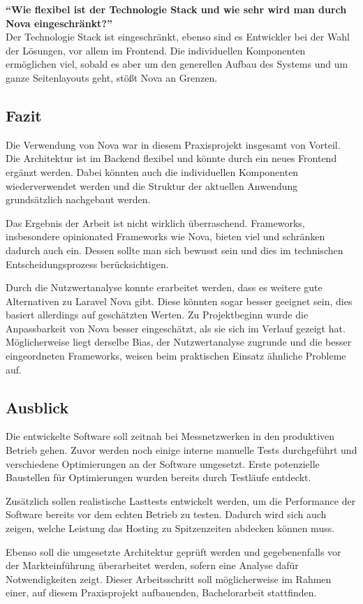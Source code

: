 \textbf{\enquote{Wie flexibel ist der Technologie Stack und wie sehr wird man durch Nova eingeschränkt?}}\\
Der Technologie Stack ist eingeschränkt, ebenso sind es Entwickler bei der Wahl der Lösungen, vor allem im Frontend.
Die individuellen Komponenten ermöglichen viel, sobald es aber um den generellen Aufbau des Systems und um ganze Seitenlayouts geht, stößt Nova an Grenzen.

\subsection{Fazit}
Die Verwendung von Nova war in diesem Praxisprojekt insgesamt von Vorteil.
Die Architektur ist im Backend flexibel und könnte durch ein neues Frontend ergänzt werden.
Dabei könnten auch die individuellen Komponenten wiederverwendet werden und die Struktur der aktuellen Anwendung grundsätzlich nachgebaut werden.

Das Ergebnis der Arbeit ist nicht wirklich überraschend.
Frameworks, insbesondere opinionated Frameworks wie Nova, bieten viel und schränken dadurch auch ein.
Dessen sollte man sich bewusst sein und dies im technischen Entscheidungsprozess berücksichtigen.

Durch die Nutzwertanalyse konnte erarbeitet werden, dass es weitere gute Alternativen zu Laravel Nova gibt.
Diese könnten sogar besser geeignet sein, dies basiert allerdings auf geschätzten Werten.
Zu Projektbeginn wurde die Anpassbarkeit von Nova besser eingeschätzt, als sie sich im Verlauf gezeigt hat.
Möglicherweise liegt derselbe Bias, der Nutzwertanalyse zugrunde und die besser eingeordneten Frameworks, weisen beim praktischen Einsatz ähnliche Probleme auf.

\subsection{Ausblick}
Die entwickelte Software soll zeitnah bei Messnetzwerken in den produktiven Betrieb gehen.
Zuvor werden noch einige interne manuelle Tests durchgeführt und verschiedene Optimierungen an der Software umgesetzt.
Erste potenzielle Baustellen für Optimierungen wurden bereits durch Testläufe entdeckt.

Zusätzlich sollen realistische Lasttests entwickelt werden, um die Performance der Software bereits vor dem echten Betrieb zu testen.
Dadurch wird sich auch zeigen, welche Leistung das Hosting zu Spitzenzeiten abdecken können muss.

Ebenso soll die umgesetzte Architektur geprüft werden und gegebenenfalls vor der Markteinführung überarbeitet werden, sofern eine Analyse dafür Notwendigkeiten zeigt.
Dieser Arbeitsschritt soll möglicherweise im Rahmen einer, auf diesem Praxisprojekt aufbauenden, Bachelorarbeit stattfinden.
